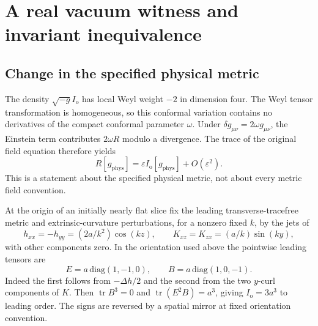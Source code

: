 \documentclass[11pt]{article}
\newcommand{\tr}{\operatorname{tr}}
\newcommand{\ep}{\varepsilon}
\begin{document}
\section{A real vacuum witness and invariant inequivalence}
\subsection{Change in the specified physical metric}
The density \(\sqrt{-g}I_{\mathrm o}\) has local Weyl weight \(-2\) in dimension four. The Weyl tensor transformation is homogeneous, so this conformal variation contains no derivatives of the compact conformal parameter \(\omega\). Under \(\delta g_{\mu\nu}=2\omega g_{\mu\nu}\), the Einstein term contributes \(2\omega R\) modulo a divergence. The trace of the original field equation therefore yields
\begin{equation}
 R[g_{\mathrm{phys}}]=\ep I_{\mathrm o}[g_{\mathrm{phys}}]+O(\ep^2).
 \label{traceread}
\end{equation}
This is a statement about the specified physical metric, not about every metric field convention.

At the origin of an initially nearly flat slice fix the leading transverse-tracefree metric and extrinsic-curvature perturbations, for a nonzero fixed \(k\), by the jets of
\begin{equation}
 h_{xx}=-h_{yy}=(2a/k^2)\cos(kz),\qquad K_{xz}=K_{zx}=(a/k)\sin(ky),
 \label{jets}
\end{equation}
with other components zero. In the orientation used above the pointwise leading tensors are
\[
 E=a\,\mathrm{diag}(1,-1,0),\qquad B=a\,\mathrm{diag}(1,0,-1).
\]
Indeed the first follows from \(-\Delta h/2\) and the second from the two \(y\)-curl components of \(K\). Then \(\tr B^3=0\) and \(\tr(E^2B)=a^3\), giving \(I_{\mathrm o}=3a^3\) to leading order. The signs are reversed by a spatial mirror at fixed orientation convention.
\end{document}
